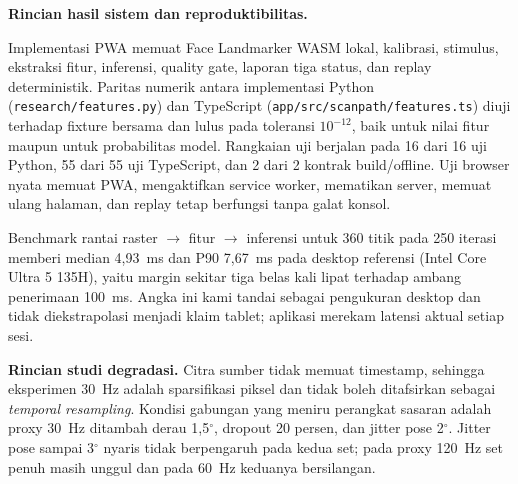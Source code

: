 \documentclass{article}
\begin{document}
\textbf{Rincian hasil sistem dan reproduktibilitas.}

Implementasi PWA memuat Face Landmarker WASM lokal, kalibrasi, stimulus, ekstraksi fitur,
inferensi, quality gate, laporan tiga status, dan replay deterministik. Paritas numerik
antara implementasi Python (\texttt{research/features.py}) dan TypeScript
(\texttt{app/src/scanpath/features.ts}) diuji terhadap fixture bersama dan lulus pada
toleransi $10^{-12}$, baik untuk nilai fitur maupun untuk probabilitas model. Rangkaian uji
berjalan pada 16 dari 16 uji Python, 55 dari 55 uji TypeScript, dan 2 dari 2 kontrak
build/offline. Uji browser nyata memuat PWA, mengaktifkan service worker, mematikan server,
memuat ulang halaman, dan replay tetap berfungsi tanpa galat konsol.

Benchmark rantai raster $\rightarrow$ fitur $\rightarrow$ inferensi untuk 360 titik pada 250
iterasi memberi median 4,93~ms dan P90 7,67~ms pada desktop referensi (Intel Core Ultra 5
135H), yaitu margin sekitar tiga belas kali lipat terhadap ambang penerimaan 100~ms. Angka
ini kami tandai sebagai pengukuran desktop dan tidak diekstrapolasi menjadi klaim tablet;
aplikasi merekam latensi aktual setiap sesi.

\textbf{Rincian studi degradasi.} Citra sumber tidak memuat timestamp, sehingga eksperimen
30~Hz adalah sparsifikasi piksel dan tidak boleh ditafsirkan sebagai \emph{temporal
resampling}. Kondisi gabungan yang meniru perangkat sasaran adalah proxy 30~Hz ditambah
derau 1,5$^\circ$, dropout 20 persen, dan jitter pose 2$^\circ$. Jitter pose sampai
3$^\circ$ nyaris tidak berpengaruh pada kedua set; pada proxy 120~Hz set penuh masih unggul
dan pada 60~Hz keduanya bersilangan.
\end{document}

